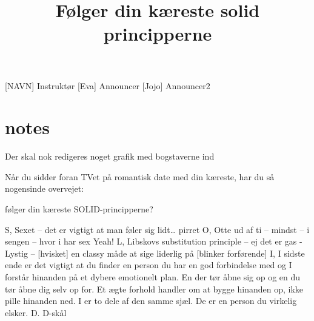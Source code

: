 \documentclass[a4paper,11pt]{article}
\title{Følger din kæreste solid principperne}
\author{}
\begin{document}
\maketitle

\begin{roles}
[NAVN] Instruktør
 [Eva] Announcer
 [Jojo] Announcer2
\end{roles}

\begin{props}

\end{props}

\section*{notes} Der skal nok redigeres noget grafik med bogstaverne ind 


\begin{sketch}

 Når du sidder foran TVet på romantisk date med din kæreste, har du så nogensinde overvejet: 

følger din kæreste SOLID-principperne?

 S, Sexet – det er vigtigt at man føler sig lidt… pirret
 O,   Otte ud af ti – mindst – i sengen – hvor i har sex
 Yeah! 
L, Libskovs substitution principle – ej det er gas - Lystig – [hvisket] en classy måde at sige liderlig på [blinker forførende]
I, I sidste ende er det vigtigt at du finder en person du har en god forbindelse med og I forstår hinanden på et dybere emotionelt plan. En der tør åbne sig op og en du tør åbne dig selv op for. Et ægte forhold handler om at bygge hinanden op, ikke pille hinanden ned. I er to dele af den samme sjæl. De er en person du virkelig elsker.
 D.
D-skål

\end{sketch}
\end{document}
